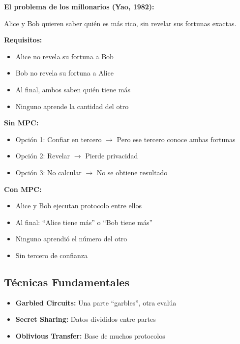\documentclass[11pt,a4paper,twoside]{book}
\begin{document}
\begin{intuicion}
\textbf{El problema de los millonarios (Yao, 1982):}

Alice y Bob quieren saber qui\'en es m\'as rico, sin revelar sus fortunas exactas.

\textbf{Requisitos:}
\begin{itemize}
    \item Alice no revela su fortuna a Bob
    \item Bob no revela su fortuna a Alice
    \item Al final, ambos saben qui\'en tiene m\'as
    \item Ninguno aprende la cantidad del otro
\end{itemize}

\textbf{Sin MPC:}
\begin{itemize}
    \item Opci\'on 1: Confiar en tercero $\to$ Pero ese tercero conoce ambas fortunas
    \item Opci\'on 2: Revelar $\to$ Pierde privacidad
    \item Opci\'on 3: No calcular $\to$ No se obtiene resultado
\end{itemize}

\textbf{Con MPC:}
\begin{itemize}
    \item Alice y Bob ejecutan protocolo entre ellos
    \item Al final: ``Alice tiene m\'as'' o ``Bob tiene m\'as''
    \item Ninguno aprendi\'o el n\'umero del otro
    \item Sin tercero de confianza
\end{itemize}
\end{intuicion}

\subsection{T\'ecnicas Fundamentales}

\begin{itemize}
    \item \textbf{Garbled Circuits:} Una parte ``garbles'', otra eval\'ua
    \item \textbf{Secret Sharing:} Datos divididos entre partes
    \item \textbf{Oblivious Transfer:} Base de muchos protocolos
\end{itemize}
\end{document}
